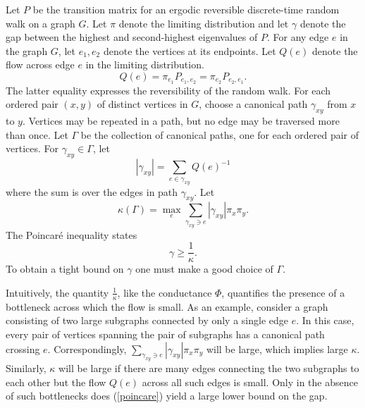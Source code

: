 Let $P$ be the transition matrix for an ergodic reversible
discrete-time random walk on a graph $G$. Let $\pi$ denote the
limiting distribution and let $\gamma$ denote the gap between the
highest and second-highest eigenvalues of $P$. For
any edge $e$ in the graph $G$, let $e_1,e_2$ denote the vertices at
its endpoints. Let $Q(e)$ denote the flow across edge $e$ in the
limiting distribution.
\begin{equation}
Q(e) = \pi_{e_1} P_{e_1,e_2} = \pi_{e_2} P_{e_2,e_1}.
\end{equation} 
The latter equality expresses the reversibility of the random walk.
For each ordered pair $(x,y)$ of distinct vertices in $G$, choose a
canonical path $\gamma_{xy}$ from $x$ to $y$. Vertices may be repeated
in a path, but no edge may be traversed more than once. Let $\Gamma$
be the collection of canonical paths, one for each ordered pair of
vertices. For
$\gamma_{xy} \in \Gamma$, let
\begin{equation}
|\gamma_{xy}| = \sum_{e \in \gamma_{xy}} Q(e)^{-1}
\end{equation}
where the sum is over the edges in path $\gamma_{xy}$. Let
\begin{equation}
\kappa(\Gamma) = \max_e \sum_{\gamma_{xy} \owns e} |\gamma_{xy}|
\pi_x \pi_y.
\end{equation}
The Poincar\'e inequality states \cite{DS91}
\begin{equation}
\label{poincare}
\gamma \geq \frac{1}{\kappa}.
\end{equation}
To obtain a tight bound on $\gamma$ one must make a good choice of
$\Gamma$.

Intuitively, the quantity $\frac{1}{\kappa}$, like the conductance
$\Phi$, quantifies the presence of a bottleneck across which the flow
is small. As an example, consider a graph consisting of two large
subgraphs connected by only a single edge $e$. In this case, every pair of
vertices spanning the pair of subgraphs has a canonical path crossing
$e$. Correspondingly, $\sum_{\gamma_{xy} \owns e} |\gamma_{xy}| \pi_x \pi_y$ will
be large, which implies large $\kappa$. Similarly, $\kappa$ will be
large if there are many edges connecting the two subgraphs to each
other but the flow $Q(e)$ across all such edges is small. Only in the
absence of such bottlenecks does (\ref{poincare}) yield a large lower
bound on the gap.

